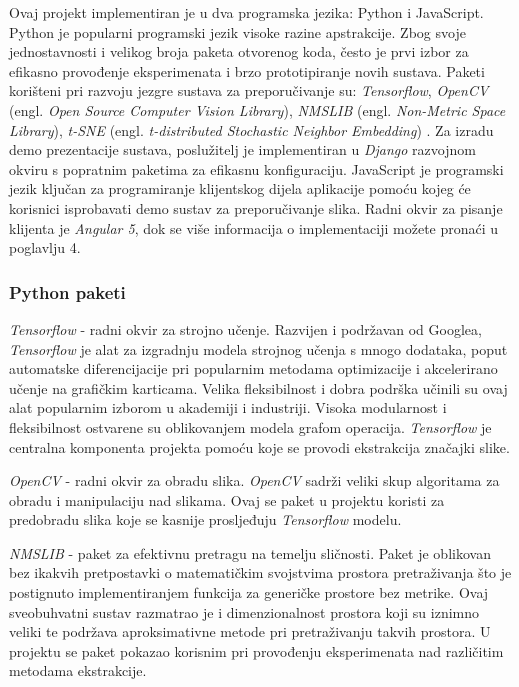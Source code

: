 \documentclass[times, utf8, proizvoljni, numeric]{fer}
\begin{document}
Ovaj projekt implementiran je u dva programska jezika: Python i JavaScript. 
Python je popularni programski jezik visoke razine apstrakcije. Zbog svoje jednostavnosti i velikog broja paketa otvorenog koda, često je prvi izbor za efikasno provođenje eksperimenata i brzo prototipiranje novih sustava. Paketi korišteni pri razvoju jezgre sustava za preporučivanje su: \textit{Tensorflow}, \textit{OpenCV} (engl. \textit{Open Source Computer Vision Library}), \textit{NMSLIB}  (engl. \textit{Non-Metric Space Library}), \textit{t-SNE}  (engl. \textit{t-distributed Stochastic Neighbor Embedding}) . Za izradu demo prezentacije sustava, poslužitelj je implementiran u \textit{Django} razvojnom okviru s popratnim paketima za efikasnu konfiguraciju. 
JavaScript je programski jezik ključan za programiranje klijentskog dijela aplikacije pomoću kojeg će korisnici isprobavati demo sustav za preporučivanje slika. Radni okvir za pisanje klijenta je \textit{Angular 5}, dok se više informacija o implementaciji možete pronaći u poglavlju 4.

\subsubsection{Python paketi }

\textit{Tensorflow} \cite{tensorflow2015-whitepaper} - radni okvir za strojno učenje. Razvijen i podržavan od Googlea, \textit{Tensorflow} je alat za izgradnju modela strojnog učenja s mnogo dodataka, poput automatske diferencijacije pri popularnim metodama optimizacije i akcelerirano učenje na grafičkim karticama. Velika fleksibilnost i dobra podrška učinili su ovaj alat popularnim izborom u akademiji i industriji. Visoka modularnost i fleksibilnost ostvarene su oblikovanjem modela grafom operacija.
\textit{Tensorflow} je centralna komponenta projekta pomoću koje se provodi ekstrakcija značajki slike.

\textit{OpenCV} \cite{itseez2015opencv} - radni okvir za obradu slika. \textit{OpenCV} sadrži veliki skup algoritama za obradu i manipulaciju nad slikama. Ovaj se paket u projektu koristi za predobradu slika koje se kasnije prosljeđuju \textit{Tensorflow} modelu.


\textit{NMSLIB} \cite{NMSLIB} - paket za efektivnu pretragu na temelju sličnosti. Paket je oblikovan bez ikakvih pretpostavki o matematičkim svojstvima prostora pretraživanja što je postignuto implementiranjem funkcija za generičke prostore bez metrike. Ovaj sveobuhvatni sustav razmatrao je i dimenzionalnost prostora koji su iznimno veliki te podržava aproksimativne metode pri pretraživanju takvih prostora. U projektu se paket pokazao korisnim pri provođenju eksperimenata nad različitim metodama ekstrakcije. 
\end{document}
